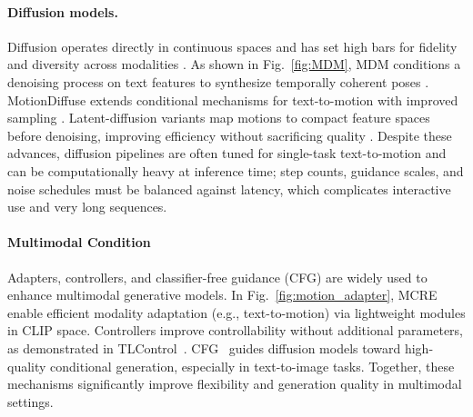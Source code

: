 \documentclass[a4paper,12pt]{article}
\begin{document}
\paragraph{Diffusion models.}
Diffusion operates directly in continuous spaces and has set high bars for fidelity and diversity across modalities \cite{sohl2015deep}.  As shown in Fig.~\ref{fig:MDM}, MDM conditions a denoising process on text features to synthesize temporally coherent poses \cite{tevet2022human}. MotionDiffuse extends conditional mechanisms for text-to-motion with improved sampling \cite{zhang2024motiondiffuse}. Latent-diffusion variants map motions to compact feature spaces before denoising, improving efficiency without sacrificing quality \cite{chen2023executing}. Despite these advances, diffusion pipelines are often tuned for single-task text-to-motion and can be computationally heavy at inference time; step counts, guidance scales, and noise schedules must be balanced against latency, which complicates interactive use and very long sequences.



\paragraph{Multimodal Condition}
Adapters, controllers, and classifier-free guidance (CFG) are widely used to enhance multimodal generative models. In Fig.~\ref{fig:motion_adapter}, MCRE~\cite{sun2024mcre} enable efficient modality adaptation (e.g., text-to-motion) via lightweight modules in CLIP space. Controllers improve controllability without additional parameters, as demonstrated in TLControl~\cite{wan2024tlcontrol}. CFG~\cite{shen2024rethinking,kwon2025tcfg} guides diffusion models toward high-quality conditional generation, especially in text-to-image tasks. Together, these mechanisms significantly improve flexibility and generation quality in multimodal settings.
\end{document}

